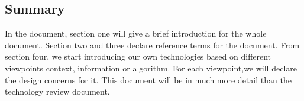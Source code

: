 \subsection{Summary}
In the document, section one will give a brief introduction for the whole document. Section two and three declare reference terms for the document. From section four, we start introducing our own technologies based on different viewpoints context, information or algorithm. For each viewpoint,we will declare the design concerns for it. This document will be in much more detail than the technology review document.  
 
